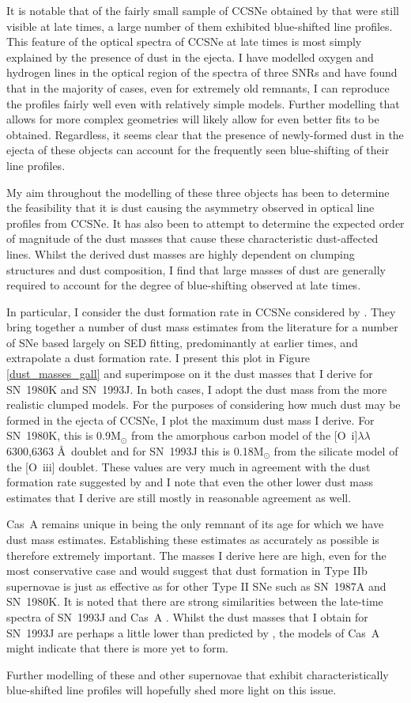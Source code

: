 It is notable that of the fairly small sample of CCSNe obtained by \citet{Milisavljevic2012} that were still visible at late times, a large number of them exhibited blue-shifted line profiles.  This feature of the optical spectra of CCSNe at late times is most simply explained by the presence of dust in the ejecta.  I have modelled oxygen and hydrogen lines in the optical region of the spectra of three SNRs and have found that in the majority of cases, even for extremely old remnants, I can reproduce the profiles fairly well even with relatively simple models.  Further modelling that allows for more complex geometries will likely allow for even better fits to be obtained.  Regardless, it seems clear that the presence of newly-formed dust in the ejecta of these objects can account for the frequently seen blue-shifting of their line profiles.

My aim throughout the modelling of these three objects has been to determine the feasibility that it is dust causing the asymmetry observed in optical line profiles from CCSNe.  It has also been to attempt to determine the expected order of magnitude of the dust masses that cause these characteristic dust-affected lines.  Whilst the derived dust masses are highly dependent on clumping structures and dust composition, I find that large masses of dust are generally required to account for the degree of blue-shifting observed at late times.  

In particular, I consider the dust formation rate in CCSNe considered by \citet{Gall2014}.  They bring together a number of dust mass estimates from the literature for a number of SNe based largely on SED fitting, predominantly at earlier times, and extrapolate a dust formation rate.  I present this plot in Figure \ref{dust_masses_gall} and superimpose on it the dust masses that I derive for SN~1980K and SN~1993J.  In both cases, I adopt the dust mass from the more realistic clumped models.  For the purposes of considering how much dust may be formed in the ejecta of CCSNe, I plot the maximum dust mass I derive.  For SN~1980K, this is 0.9M$_{\odot}$ from the amorphous carbon model of the [O~{\sc i}]$\lambda\lambda$6300,6363 \AA\ doublet and for SN~1993J this is 0.18M$_{\odot}$ from the silicate model of the [O~{\sc iii}] doublet.  These values are very much in agreement with the dust formation rate suggested by \citet{Gall2014} and I note that even the other lower dust mass estimates that I derive are still mostly in reasonable agreement as well.

Cas~A remains unique in being the only remnant of its age for which we have dust mass estimates.  Establishing these estimates as accurately as possible is therefore extremely important.  The masses I derive here are high, even for the most conservative case and would suggest that dust formation in Type IIb supernovae is just as effective as for other Type II SNe such as SN~1987A and SN~1980K.  It is noted that there are strong similarities between the late-time spectra of SN~1993J and Cas~A \citep{Milisavljevic2012}.  Whilst the dust masses that I obtain for SN~1993J are perhaps a little lower than predicted by \citet{Gall2014}, the models of Cas~A might indicate that there is more yet to form.

Further modelling of these and other supernovae that exhibit characteristically blue-shifted line profiles will hopefully shed more light on this issue.

